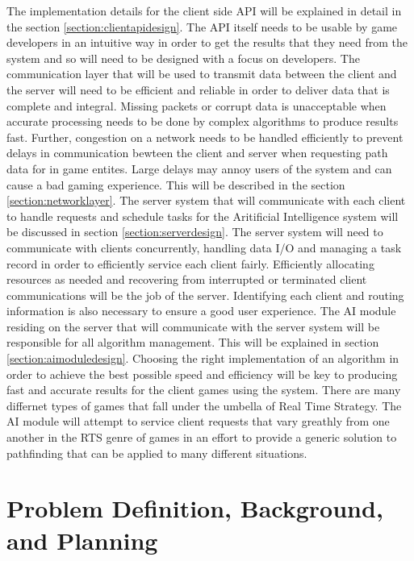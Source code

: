 \documentclass[12pt,a4paper,titlepage]{article}
\begin{document}
The implementation details for the client side API will be explained in detail in the section \ref{section:clientapidesign}. The API itself needs to be usable by game developers in an intuitive way in order to get the results that they need from the system and so will need to be designed with a focus on developers. The communication layer that will be used to transmit data between the client and the server will need to be efficient and reliable in order to deliver data that is complete and integral. Missing packets or corrupt data is unacceptable when accurate processing needs to be done by complex algorithms to produce results fast. Further, congestion on a network needs to be handled efficiently to prevent delays in communication bewteen the client and server when requesting path data for in game entites. Large delays may annoy users of the system and can cause a bad gaming experience. This will be described in the section \ref{section:networklayer}. The server system that will communicate with each client to handle requests and schedule tasks for the Aritificial Intelligence system will be discussed in section \ref{section:serverdesign}. The server system will need to communicate with clients concurrently, handling data I/O and managing a task record in order to efficiently service each client fairly. Efficiently allocating resources as needed and recovering from interrupted or terminated client communications will be the job of the server. Identifying each client and routing information is also necessary to ensure a good user experience. The AI module residing on the server that will communicate with the server system will be responsible for all algorithm management. This will be explained in section \ref{section:aimoduledesign}. Choosing the right implementation of an algorithm in order to achieve the best possible speed and efficiency will be key to producing fast and accurate results for the client games using the system. There are many differnet types of games that fall under the umbella of Real Time Strategy. The AI module will attempt to service client requests that vary greathly from one another in the RTS genre of games in an effort to provide a generic solution to pathfinding that can be applied to many different situations.

\section{Problem Definition, Background, and Planning}
\end{document}
